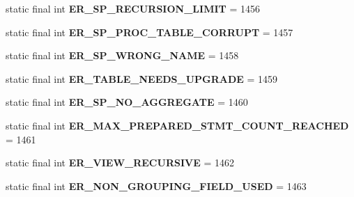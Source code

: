 \begin{DoxyCompactItemize}
static final int {\bfseries E\+R\+\_\+\+S\+P\+\_\+\+R\+E\+C\+U\+R\+S\+I\+O\+N\+\_\+\+L\+I\+M\+IT} = 1456
\item 
\mbox{\label{classcom_1_1mysql_1_1jdbc_1_1_mysql_error_numbers_affdad92478e1d22245fc58c12c358b81}} 
static final int {\bfseries E\+R\+\_\+\+S\+P\+\_\+\+P\+R\+O\+C\+\_\+\+T\+A\+B\+L\+E\+\_\+\+C\+O\+R\+R\+U\+PT} = 1457
\item 
\mbox{\label{classcom_1_1mysql_1_1jdbc_1_1_mysql_error_numbers_a977869499c964df7ee5f12d19813fcd8}} 
static final int {\bfseries E\+R\+\_\+\+S\+P\+\_\+\+W\+R\+O\+N\+G\+\_\+\+N\+A\+ME} = 1458
\item 
\mbox{\label{classcom_1_1mysql_1_1jdbc_1_1_mysql_error_numbers_aff15102a6cd75b61971709d4f5892e0a}} 
static final int {\bfseries E\+R\+\_\+\+T\+A\+B\+L\+E\+\_\+\+N\+E\+E\+D\+S\+\_\+\+U\+P\+G\+R\+A\+DE} = 1459
\item 
\mbox{\label{classcom_1_1mysql_1_1jdbc_1_1_mysql_error_numbers_ac4c02ebb9de77bb0181cb0d09e85f466}} 
static final int {\bfseries E\+R\+\_\+\+S\+P\+\_\+\+N\+O\+\_\+\+A\+G\+G\+R\+E\+G\+A\+TE} = 1460
\item 
\mbox{\label{classcom_1_1mysql_1_1jdbc_1_1_mysql_error_numbers_ad8536c3f0f2b99171682f79f313488b5}} 
static final int {\bfseries E\+R\+\_\+\+M\+A\+X\+\_\+\+P\+R\+E\+P\+A\+R\+E\+D\+\_\+\+S\+T\+M\+T\+\_\+\+C\+O\+U\+N\+T\+\_\+\+R\+E\+A\+C\+H\+ED} = 1461
\item 
\mbox{\label{classcom_1_1mysql_1_1jdbc_1_1_mysql_error_numbers_aed98759a97f2bb285a680de1d038b7c4}} 
static final int {\bfseries E\+R\+\_\+\+V\+I\+E\+W\+\_\+\+R\+E\+C\+U\+R\+S\+I\+VE} = 1462
\item 
\mbox{\label{classcom_1_1mysql_1_1jdbc_1_1_mysql_error_numbers_af78a1aa36971d279094c923a085241d9}} 
static final int {\bfseries E\+R\+\_\+\+N\+O\+N\+\_\+\+G\+R\+O\+U\+P\+I\+N\+G\+\_\+\+F\+I\+E\+L\+D\+\_\+\+U\+S\+ED} = 1463
\item 

\end{DoxyCompactItemize}
